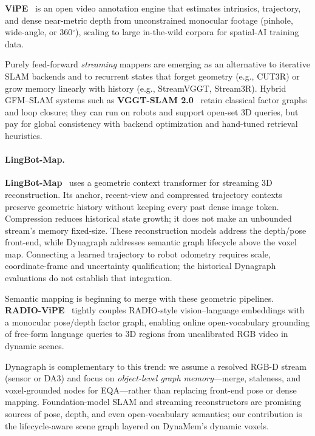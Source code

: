 \textbf{ViPE}~\citep{huang2025vipe} is an open video annotation engine that estimates intrinsics, trajectory, and dense near-metric depth from unconstrained monocular footage (pinhole, wide-angle, or 360$^\circ$), scaling to large in-the-wild corpora for spatial-AI training data.

Purely feed-forward \emph{streaming} mappers are emerging as an alternative to iterative SLAM backends and to recurrent states that forget geometry (e.g., CUT3R) or grow memory linearly with history (e.g., StreamVGGT, Stream3R).
Hybrid GFM--SLAM systems such as \textbf{VGGT-SLAM 2.0}~\citep{maggio2026vggtslam2} retain classical factor graphs and loop closure; they can run on robots and support open-set 3D queries, but pay for global consistency with backend optimization and hand-tuned retrieval heuristics.

\paragraph{LingBot-Map.}
\textbf{LingBot-Map}~\citep{chen2026lingbotmap} uses a geometric context
transformer for streaming 3D reconstruction. Its anchor, recent-view and
compressed trajectory contexts preserve geometric history without keeping every
past dense image token. Compression reduces historical state growth; it does
not make an unbounded stream's memory fixed-size. These reconstruction models
address the depth/pose front-end, while Dynagraph addresses semantic graph
lifecycle above the voxel map. Connecting a learned trajectory to robot
odometry requires scale, coordinate-frame and uncertainty qualification; the
historical Dynagraph evaluations do not establish that integration.

Semantic mapping is beginning to merge with these geometric pipelines.
\textbf{RADIO-ViPE}~\citep{nasser2026radiovipe} tightly couples RADIO-style vision--language embeddings with a monocular pose/depth factor graph, enabling online open-vocabulary grounding of free-form language queries to 3D regions from uncalibrated RGB video in dynamic scenes.

Dynagraph is complementary to this trend: we assume a resolved RGB-D stream (sensor or DA3) and focus on \emph{object-level graph memory}---merge, staleness, and voxel-grounded nodes for EQA---rather than replacing front-end pose or dense mapping.
Foundation-model SLAM and streaming reconstructors are promising sources of pose, depth, and even open-vocabulary semantics; our contribution is the lifecycle-aware scene graph layered on DynaMem's dynamic voxels.

